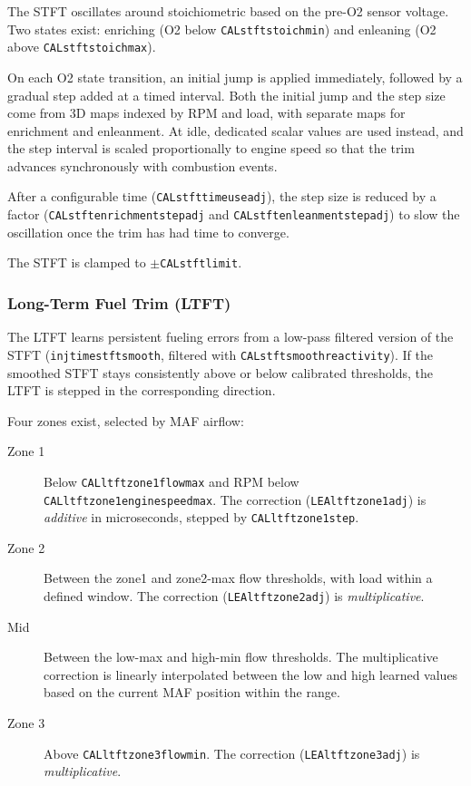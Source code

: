 \documentclass[a4paper,11pt]{article}
\renewcommand{\_}{\oldunderscore\allowbreak}
\begin{document}
The STFT oscillates around stoichiometric based on the pre-O2 sensor voltage.
Two states exist: enriching (O2 below \texttt{CAL\_stft\_stoich\_min})
and enleaning (O2 above \texttt{CAL\_stft\_stoich\_max}).

On each O2 state transition, an initial jump is applied immediately, followed
by a gradual step added at a timed interval. Both the initial jump and the
step size come from 3D maps indexed by RPM and load, with separate maps for
enrichment and enleanment. At idle, dedicated scalar values are used instead,
and the step interval is scaled proportionally to engine speed so that the
trim advances synchronously with combustion events.

After a configurable time (\texttt{CAL\_stft\_time\_use\_adj}),
the step size is reduced by a factor
(\texttt{CAL\_stft\_enrichment\_step\_adj} and
\texttt{CAL\_stft\_enleanment\_step\_adj}) to slow
the oscillation once the trim has had time to converge.

The STFT is clamped to $\pm$\texttt{CAL\_stft\_limit}.

\subsubsection*{Long-Term Fuel Trim (LTFT)}

The LTFT learns persistent fueling errors from a low-pass filtered version of
the STFT (\texttt{inj\_time\_stft\_smooth}, filtered with
\texttt{CAL\_stft\_smooth\_reactivity}). If the smoothed STFT
stays consistently above or below calibrated thresholds, the LTFT is stepped
in the corresponding direction.

Four zones exist, selected by MAF airflow:

\begin{description}
	\item[Zone 1] Below \texttt{CAL\_ltft\_zone1\_flow\_max}
	      and RPM below
	      \texttt{CAL\_ltft\_zone1\_engine\_speed\_max}.
	      The correction (\texttt{LEA\_ltft\_zone1\_adj}) is \emph{additive}
	      in microseconds, stepped by
	      \texttt{CAL\_ltft\_zone1\_step}.
	\item[Zone 2] Between the zone1 and zone2-max flow thresholds, with load
	      within a defined window. The correction
	      (\texttt{LEA\_ltft\_zone2\_adj}) is \emph{multiplicative}.
	\item[Mid] Between the low-max and high-min flow thresholds. The
	      multiplicative correction is linearly interpolated between the low
	      and high learned values based on the current MAF position within
	      the range.
	\item[Zone 3] Above \texttt{CAL\_ltft\_zone3\_flow\_min}.
	      The correction (\texttt{LEA\_ltft\_zone3\_adj}) is
	      \emph{multiplicative}.
\end{description}
\end{document}
